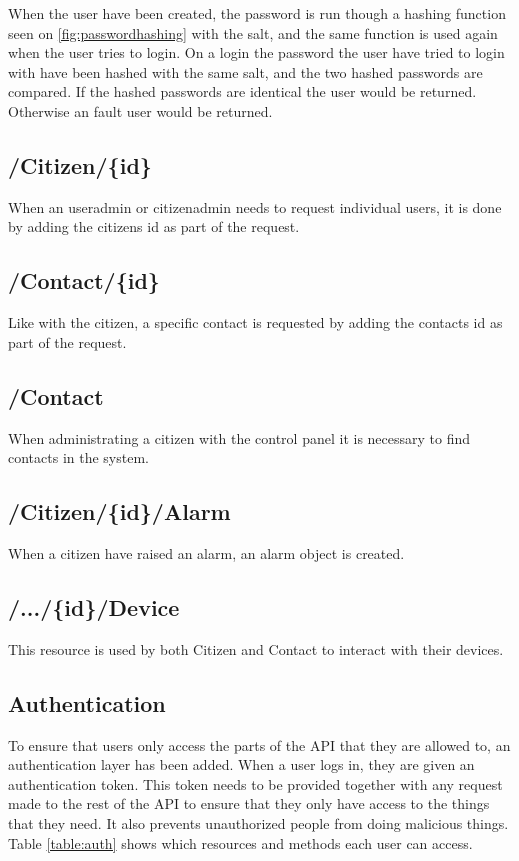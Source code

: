When the user have been created, the password is run though a hashing function seen on \ref{fig:passwordhashing} with the salt, and the same function is used again when the user tries to login. On a login the password the user have tried to login with have been hashed with the same salt, and the two hashed passwords are compared. If the hashed passwords are identical the user would be returned. Otherwise an fault user would be returned.


\subsection*{/Citizen/\{id\}}
When an useradmin or citizenadmin needs to request individual users, it is done by adding the citizens id as part of the request.

\subsection*{/Contact/\{id\}}
Like with the citizen, a specific contact is requested by adding the contacts id as part of the request.

\subsection*{/Contact}
When administrating a citizen with the control panel it is necessary to find contacts in the system. 

\subsection*{/Citizen/\{id\}/Alarm}
When a citizen have raised an alarm, an alarm object is created. 

\subsection*{/.../\{id\}/Device}
This resource is used by both Citizen and Contact to interact with their devices.


\subsection*{Authentication}

To ensure that users only access the parts of the API that they are allowed to, an authentication layer has been added. When a user logs in, they are given an authentication token. This token needs to be provided together with any request made to the rest of the API to ensure that they only have access to the things that they need. It also prevents unauthorized people from doing malicious things. Table \ref{table:auth} shows which resources and methods each user can access.


